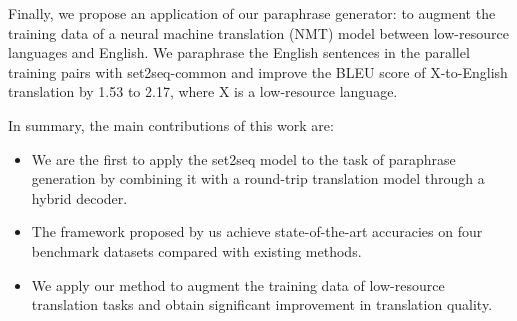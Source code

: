 Finally, we propose an application of our paraphrase generator: 
to augment the training data of 
a neural machine translation (NMT) model between low-resource languages 
and English. 
We paraphrase the English sentences in the parallel training pairs 
with set2seq-common and improve the BLEU score of X-to-English 
translation by 1.53 to 2.17, where X is a low-resource language.

In summary, the main contributions of this work are:
\begin{itemize}
\item We are the first to apply the set2seq model to the task of paraphrase generation by combining it with a round-trip translation model through a hybrid decoder.
\item The framework proposed by us achieve state-of-the-art accuracies on 
four benchmark datasets compared with existing methods.
\item We apply our method to augment the training data of low-resource
translation tasks and obtain significant improvement in translation quality.
\end{itemize}

